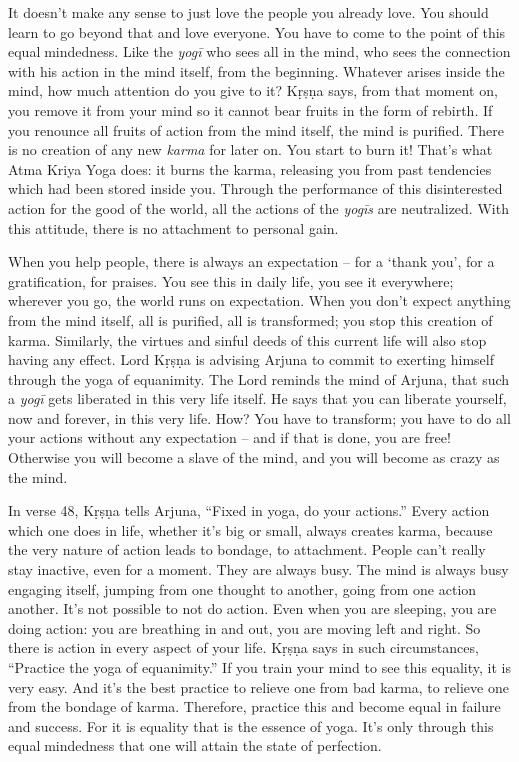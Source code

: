 It doesn’t make any sense to just love the people you already love. You should learn to go beyond that and love everyone. You have to come to the point of this equalmindedness. Like the \textit{yogī} who sees all in the mind, who sees the connection with his action in the mind itself, from the beginning. Whatever arises inside the mind, how much attention do you give to it? Kṛṣṇa says, from that moment on, you remove it from your mind so it cannot bear fruits in the form of rebirth. If you renounce all fruits of action from the mind itself, the mind is purified. There is no creation of any new \textit{karma} for later on. You start to burn it! That’s what Atma Kriya Yoga does: it burns the karma, releasing you from past tendencies which had been stored inside you. Through the performance of this disinterested action for the good of the world, all the actions of the \textit{yogīs} are neutralized. With this attitude, there is no attachment to personal gain. 

When you help people, there is always an expectation – for a ‘thank you’, for a gratification, for praises. You see this in daily life, you see it everywhere; wherever you go, the world runs on expectation. When you don’t expect anything from the mind itself, all is purified, all is transformed; you stop this creation of karma. Similarly, the virtues and sinful deeds of this current life will also stop having any effect. Lord Kṛṣṇa is advising Arjuna to commit to exerting himself through the yoga of equanimity. The Lord reminds the mind of Arjuna, that such a \textit{yogī} gets liberated in this very life itself. He says that you can liberate yourself, now and forever, in this very life. How? You have to transform; you have to do all your actions without any expectation – and if that is done, you are free! Otherwise you will become a slave of the mind, and you will become as crazy as the mind.

In verse 48, Kṛṣṇa tells Arjuna, “Fixed in yoga, do your actions.” Every action which one does in life, whether it’s big or small, always creates karma, because the very nature of action leads to bondage, to attachment. People can’t really stay inactive, even for a moment. They are always busy. The mind is always busy engaging itself, jumping from one thought to another, going from one action another. It’s not possible to not do action. Even when you are sleeping, you are doing action: you are breathing in and out, you are moving left and right. So there is action in every aspect of your life. Kṛṣṇa says in such circumstances, “Practice the yoga of equanimity.” If you train your mind to see this equality, it is very easy. And it’s the best practice to relieve one from bad karma, to relieve one from the bondage of karma. Therefore, practice this and become equal in failure and success. For it is equality that is the essence of yoga. It’s only through this equalmindedness that one will attain the state of perfection.

